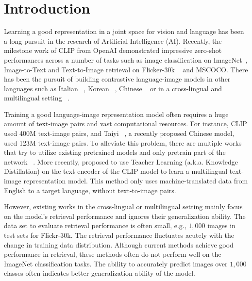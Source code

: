 \section{Introduction}
Learning a good representation in a joint space for vision and language has been a long pursuit in the research of Artificial Intelligence (AI). Recently, the milestone work of CLIP \cite{radford2021learning} from OpenAI demonstrated impressive zero-shot performances across a number of tasks such as image classification on ImageNet~\cite{deng2009imagenet}, Image-to-Text and Text-to-Image retrieval on Flicker-30k ~\cite{young2014image} and MSCOCO\cite{lin2014microsoft, chen2015microsoft}. There has been the pursuit of building contrastive language-image models in other languages such as Italian ~\cite{bianchi2021contrastive}, Korean ~\cite{ko2022large}, Chinese ~\cite{changpinyo2021conceptual, fei2021wenlan, fengshenbang, gu2022wukong, xie2022zero, yang2022chinese} or in a cross-lingual and multilingual setting ~\cite{aggarwal2020towards, carlsson2022cross}.

Training a good language-image representation model often requires a huge amount of text-image pairs and vast computational resources. For instance, CLIP used 400M text-image pairs, and Taiyi ~\cite{fengshenbang}, a recently proposed Chinese model, used 123M text-image pairs. To alleviate this problem, there are multiple works that try to utilize existing pretrained models and only pretrain part of the network ~\cite{portaz2019image, aggarwal2020towards, gu2022wukong, zhai2022lit}. More recently,  proposed to use Teacher Learning (a.k.a. Knowledge Distillation) on the text encoder of the CLIP model to learn a multilingual text-image representation model. This method only uses machine-translated data from English to a target language, without text-to-image pairs. %

However, existing works in the cross-lingual or multilingual setting mainly focus on the model's retrieval performance and ignores their generalization ability. The data set to evaluate retrieval performance is often small, e.g., $1,000$ images in test sets for Flickr-30k. The retrieval performance fluctuates acutely with the change in training data distribution. Although current methods achieve good performance in retrieval, these methods often do not perform well on the ImageNet classification tasks. The ability to accurately predict images over $1,000$ classes often indicates better generalization ability of the model. 


